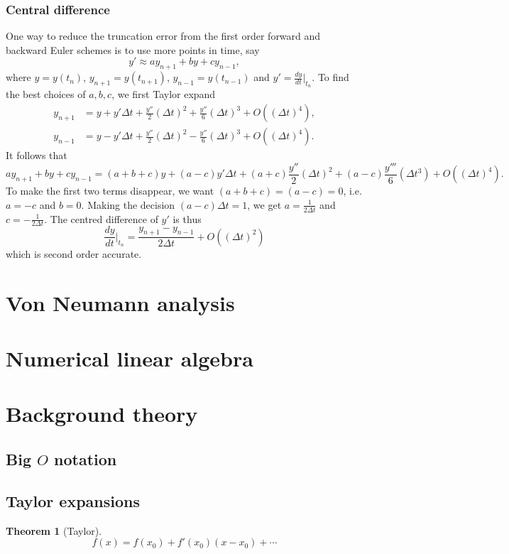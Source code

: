 \documentclass[11pt, a4paper]{article}
\theoremstyle{break}
\newtheorem{thm}{Theorem}[section]
\newcommand{\dt}{\Delta t}
\newcommand{\dder}[2]{\frac{d #1}{d #2}}
\newcommand{\eval}[1]{\big\rvert_{#1}}
\newcommand{\Eval}[1]{\bigg\rvert_{#1}}
\begin{document}
\subsubsection{Central difference}
One way to reduce the truncation error from the first order forward and backward Euler schemes is to use more points in time, say \[y'\approx a	y_{n+1}+by+cy_{n-1},\] where $y=y(t_n)$, $y_{n+1}=y(t_{n+1})$, $y_{n-1}=y(t_{n-1})$ and $y' = \dder yt\eval{t_n}$. To find the best choices of $a,b,c$, we first Taylor expand \begin{align*}
y_{n+1}&=y+y'\dt+\frac{y''}{2}(\dt)^2+\frac{y''}{6}(\dt)^3+O((\dt)^4),\\
y_{n-1}&=y-y'\dt+\frac{y''}{2}(\dt)^2-\frac{y''}{6}(\dt)^3+O((\dt)^4).
\end{align*} It follows that \[ay_{n+1}+by+cy_{n-1}=(a+b+c)y+(a-c)y'\dt+(a+c)\frac{y''}{2}(\dt)^2 +(a-c)\frac{y'''}{6}(\dt^3)+O((\dt)^4).\]
To make the first two terms disappear, we want $(a+b+c)=(a-c)=0$, i.e. $a=-c$ and $b=0$. Making the decision $(a-c)\dt=1$, we get $a=\frac1{2\dt}$ and $c=-\frac1{2\dt}$. The centred difference of $y'$ is thus \[\dder yt\Eval{t_n}=\frac{y_{n+1}-y_{n-1}}{2\dt}+O((\dt)^2)\] which is second order accurate.
\section{Von Neumann analysis}


\section{Numerical linear algebra}\label{sec:numla}


\appendix
\section{Background theory}
\subsection{\texorpdfstring{Big $O$}{Big O} notation}\label{sec:bigO}
\subsection{Taylor expansions}\label{sec:taylor}
\begin{thm}[Taylor]\label{thm:taylor}
	\[f(x)=f(x_0)+f'(x_0)(x-x_0) + \cdots\]
\end{thm}

\nocite{*}



\label{lastpage}
\end{document}
